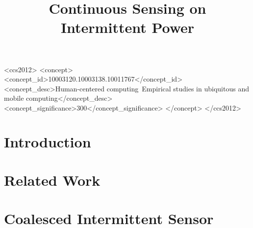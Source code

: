\documentclass[sigconf]{acmart}
\begin{document}
\title{Continuous Sensing on Intermittent Power}


\renewcommand{\shortauthors}{A. Majid et al.}


\begin{abstract}

\end{abstract}

\begin{CCSXML}
<ccs2012>
<concept>
<concept_id>10003120.10003138.10011767</concept_id>
<concept_desc>Human-centered computing~Empirical studies in ubiquitous and mobile computing</concept_desc>
<concept_significance>300</concept_significance>
</concept>
</ccs2012>
\end{CCSXML}


\maketitle


\section{Introduction}
\label{sec:introduction}


% 

\section{Related Work} %
\label{sec:relatedwork}


\section{Coalesced Intermittent Sensor}
\label{sec:coalInterSen}


\end{document}

